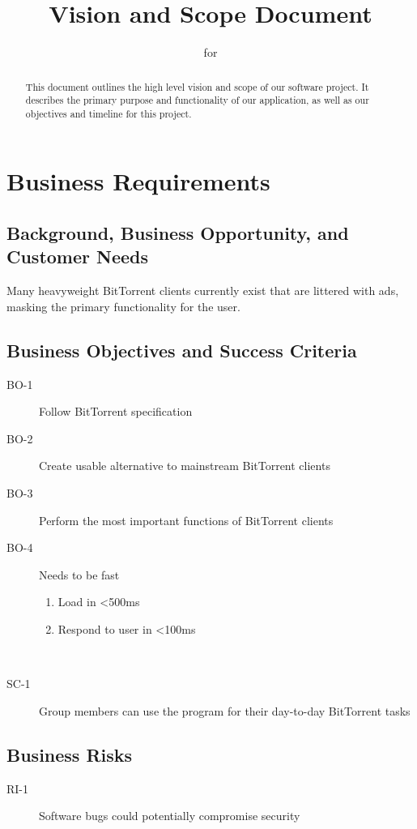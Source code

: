 \documentclass[letter]{scrartcl}
\newcommand{\app}{\sc{393torrent}}
\begin{document}
\title{Vision and Scope Document}
\subtitle{for \app}
\date{} %

\maketitle

\begin{abstract}
This document outlines the high level vision and scope of our software project.  It describes the primary purpose and functionality of our application, as well as our objectives and timeline for this project. 
\end{abstract}

\tableofcontents
\pagebreak

\section{Business Requirements}
\subsection{Background, Business Opportunity, and Customer Needs}
Many heavyweight BitTorrent clients currently exist that are littered with ads, masking the primary functionality for the user.

\subsection{Business Objectives and Success Criteria}
\begin{description}
\item[BO-1] Follow BitTorrent specification
\item[BO-2] Create usable alternative to mainstream BitTorrent clients
\item[BO-3] Perform the most important functions of BitTorrent clients
\item[BO-4] Needs to be fast 
\begin{enumerate}
  \item Load in \textless500ms
  \item Respond to user in \textless100ms
\end{enumerate}
\\
\item[SC-1] Group members can use the program for their day-to-day BitTorrent tasks
\end{description}

\subsection{Business Risks}
\begin{description}
\item[RI-1] Software bugs could potentially compromise security
\end{description}
\end{document}
